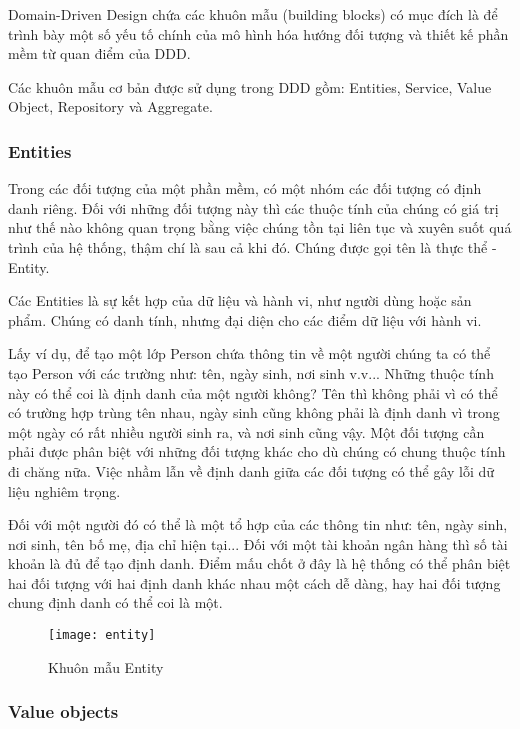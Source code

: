 Domain-Driven Design chứa các khuôn mẫu (building blocks) có mục đích là để trình bày một số yếu tố chính của mô hình hóa hướng đối tượng và thiết kế phần mềm từ quan điểm của DDD.

Các khuôn mẫu cơ bản được sử dụng trong DDD gồm: Entities, Service, Value Object, Repository và Aggregate.

\subsubsection{Entities}

Trong các đối tượng của một phần mềm, có một nhóm các đối tượng có định danh riêng. Đối với những đối tượng này thì các thuộc tính của chúng có giá trị như thế nào không quan trọng bằng việc chúng tồn tại liên tục và xuyên suốt quá trình của hệ thống, thậm chí là sau cả khi đó. Chúng được gọi tên là thực thể - Entity.

Các Entities là sự kết hợp của dữ liệu và hành vi, như người dùng hoặc sản phẩm. Chúng có danh tính, nhưng đại diện cho các điểm dữ liệu với hành vi.

Lấy ví dụ, để tạo một lớp Person chứa thông tin về một người chúng ta có thể tạo Person với các trường như: tên, ngày sinh, nơi sinh v.v... Những thuộc tính này có thể coi là định danh của một người không? Tên thì không phải vì có thể có trường hợp trùng tên nhau, ngày sinh cũng không phải là định danh vì trong một ngày có rất nhiều người sinh ra, và nơi sinh cũng vậy. Một đối tượng cần phải được phân biệt với những đối tượng khác cho dù chúng có chung thuộc tính đi chăng nữa. Việc nhầm lẫn về định danh giữa các đối tượng có thể gây lỗi dữ liệu nghiêm trọng.

Đối với một người đó có thể là một tổ hợp của các thông tin như: tên, ngày sinh, nơi sinh, tên bố mẹ, địa chỉ hiện tại... Đối với một tài khoản ngân hàng thì số tài khoản là đủ để tạo định danh. Điểm mấu chốt ở đây là hệ thống có thể phân biệt hai đối tượng với hai định danh khác nhau một cách dễ dàng, hay hai đối tượng chung định danh có thể coi là một.

\begin{figure}[H]
	\centering
	\texttt{[image: entity]}
	\caption{Khuôn mẫu Entity}
\end{figure}

\subsubsection{Value objects}

